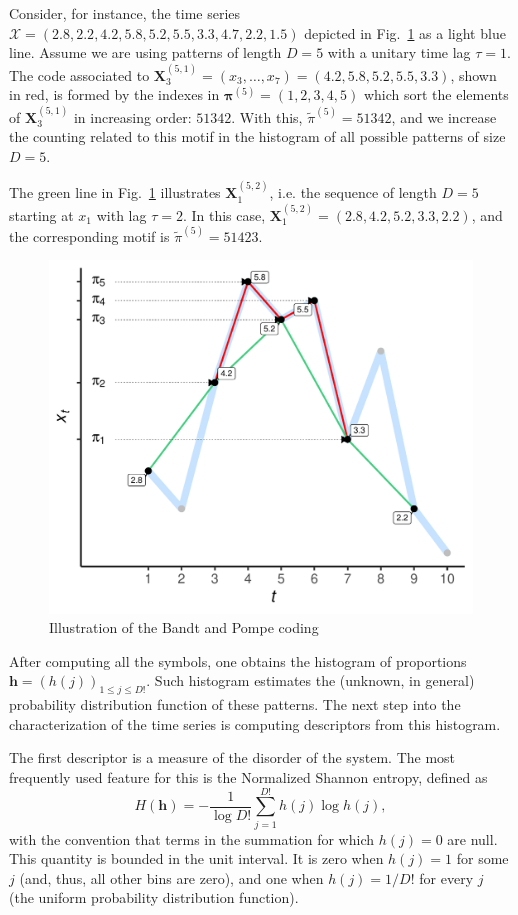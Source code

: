 \documentclass[alpha-refs]{wiley-article}
\begin{document}
Consider, for instance, the time series $\mathcal X = (2.8, 2.2, 4.2, 5.8, 5.2, 5.5, 3.3, 4.7, 2.2, 1.5)$ depicted in Fig.~\ref{Fig:IntroBP} as a light blue line.
Assume we are using patterns of length $D=5$ with a unitary time lag $\tau=1$.
The code associated to $\mathbf X_{3}^{(5,1)}=(x_3,\dots,x_7)=(4.2, 5.8, 5.2, 5.5, 3.3)$, shown in red, is formed by the indexes in $\bm\pi^{(5)}=(1,2,3,4,5)$ which sort the elements of $\mathbf X_{3}^{(5,1)}$ in increasing order: $51342$.
With this, $\widetilde{\pi}^{(5)} = 51342$, and we increase the counting related to this motif in the histogram of all possible patterns of size $D=5$.

The green line in Fig.~\ref{Fig:IntroBP} illustrates $\mathbf X_{1}^{(5,2)}$, i.e. the sequence of length $D=5$ starting at $x_1$ with lag $\tau=2$.
In this case, $\mathbf X_{1}^{(5,2)}= (2.8, 4.2, 5.2, 3.3, 2.2)$, and the corresponding motif is $\widetilde{\pi}^{(5)}=51423$.

\begin{figure}[hbt]
	\centering
	\includegraphics[width=.7\linewidth]{IntroBP}
	\caption{Illustration of the Bandt and Pompe coding}
	\label{Fig:IntroBP}
\end{figure}

After computing all the symbols, one obtains the histogram of proportions $\bm h = (h(j))_{1\leq j\leq D!}$.
Such histogram estimates the (unknown, in general) probability distribution function of these patterns.
The next step into the characterization of the time series is computing descriptors from this histogram.

The first descriptor is a measure of the disorder of the system.
The most frequently used feature for this is the Normalized Shannon entropy, defined as
\begin{equation}
	H(\bm h) = -\frac{1}{\log D!} \sum_{j=1}^{D!} h(j) \log h(j),
\end{equation}
with the convention that terms in the summation for which $h(j)=0$ are null.
This quantity is bounded in the unit interval. 
It is zero when $h(j)=1$ for some $j$ (and, thus, all other bins are zero), and one when $h(j)=1/D!$ for every $j$ (the uniform probability distribution function).
\end{document}
